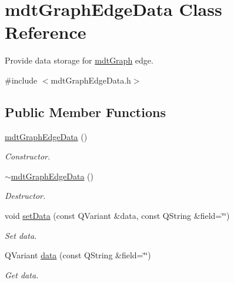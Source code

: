 \hypertarget{classmdt_graph_edge_data}{
\section{mdtGraphEdgeData Class Reference}
\label{classmdt_graph_edge_data}
}


Provide data storage for \hyperlink{classmdt_graph}{mdtGraph} edge.  




{\ttfamily \#include $<$mdtGraphEdgeData.h$>$}

\subsection*{Public Member Functions}
\begin{DoxyCompactItemize}
\item 
\hypertarget{classmdt_graph_edge_data_a4d1dcb97eb4dab7f9668e58280c00712}{
\hyperlink{classmdt_graph_edge_data_a4d1dcb97eb4dab7f9668e58280c00712}{mdtGraphEdgeData} ()}
\label{classmdt_graph_edge_data_a4d1dcb97eb4dab7f9668e58280c00712}

\begin{DoxyCompactList}\small\item\em Constructor. \end{DoxyCompactList}\item 
\hypertarget{classmdt_graph_edge_data_a0eec658b9310bab0a624c2498c377ee9}{
\hyperlink{classmdt_graph_edge_data_a0eec658b9310bab0a624c2498c377ee9}{$\sim$mdtGraphEdgeData} ()}
\label{classmdt_graph_edge_data_a0eec658b9310bab0a624c2498c377ee9}

\begin{DoxyCompactList}\small\item\em Destructor. \end{DoxyCompactList}\item 
\hypertarget{classmdt_graph_edge_data_a61e4018d882744bebb9b52e01b9ba60d}{
void \hyperlink{classmdt_graph_edge_data_a61e4018d882744bebb9b52e01b9ba60d}{setData} (const QVariant \&data, const QString \&field=\char`\"{}\char`\"{})}
\label{classmdt_graph_edge_data_a61e4018d882744bebb9b52e01b9ba60d}

\begin{DoxyCompactList}\small\item\em Set data. \end{DoxyCompactList}\item 
QVariant \hyperlink{classmdt_graph_edge_data_a25173e437047d1fce954637ecaab7b3e}{data} (const QString \&field=\char`\"{}\char`\"{})
\begin{DoxyCompactList}\small\item\em Get data. \end{DoxyCompactList}\end{DoxyCompactItemize}


